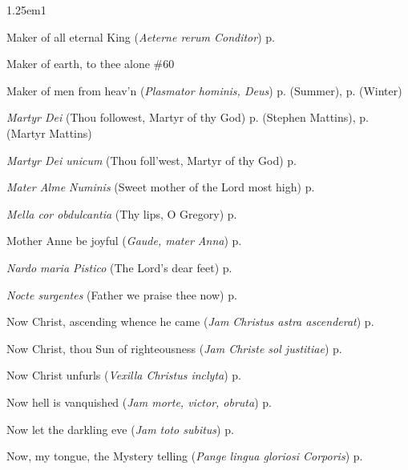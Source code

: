 \begin{hangparas}{1.25em}{1}
\par\noindent
Maker of all eternal King (\textit{Aeterne rerum Conditor}) \dotfill p. \pageref{SundayMattinsWinter}
\par\noindent
Maker of earth, to thee alone \dotfill \#60
\par\noindent
Maker of men from heav'n (\textit{Plasmator hominis, Deus}) \dotfill p. \pageref{FridayEvensongSummer} (Summer), p. \pageref{FridayEvensongWinter} (Winter)
\par\noindent
\textit{Martyr Dei} (Thou followest, Martyr of thy God) \dotfill p. \pageref{StephenMattins} (Stephen Mattins), p. \pageref{MartyrMattins} (Martyr Mattins)
\par\noindent
\textit{Martyr Dei unicum} (Thou foll'west, Martyr of thy God) \dotfill p. \pageref{MartyrMattinsEaster}
\par\noindent
\textit{Mater Alme Numinis} (Sweet mother of the Lord most high) \dotfill p. \pageref{MotherhoodMattins}
\par\noindent
\textit{Mella cor obdulcantia} (Thy lips, O Gregory) \dotfill p. \pageref{GregoryMattins}
\par\noindent
Mother Anne be joyful (\textit{Gaude, mater Anna}) \dotfill p. \pageref{AnneIEvensong}
\par\noindent
\textit{Nardo maria Pistico} (The Lord's dear feet) \dotfill p. \pageref{MaryMagdaleneInvitatory}
\par\noindent
\textit{Nocte surgentes} (Father we praise thee now) \dotfill p. \pageref{SundayInvitatorySummer}
\par\noindent
Now Christ, ascending whence he came (\textit{Jam Christus astra ascenderat}) \dotfill p. \pageref{WhitsundayInvitatoryHymn}
\par\noindent
Now Christ, thou Sun of righteousness (\textit{Jam Christe sol justitiae}) \dotfill p. \pageref{FirstLentMattinsHymn}
\par\noindent
Now Christ unfurls (\textit{Vexilla Christus inclyta}) \dotfill p. \pageref{ChristTheKingMattins}
\par\noindent
Now hell is vanquished (\textit{Jam morte, victor, obruta}) \dotfill p. \pageref{HolyRosaryMattins}
\par\noindent
Now let the darkling eve (\textit{Jam toto subitus}) \dotfill p. \pageref{SevenSorrowsEvensong}
\par\noindent
Now, my tongue, the Mystery telling (\textit{Pange lingua gloriosi Corporis}) \dotfill p. \pageref{CorpusChristiEvensong}
\par\noindent

\end{hangparas}
